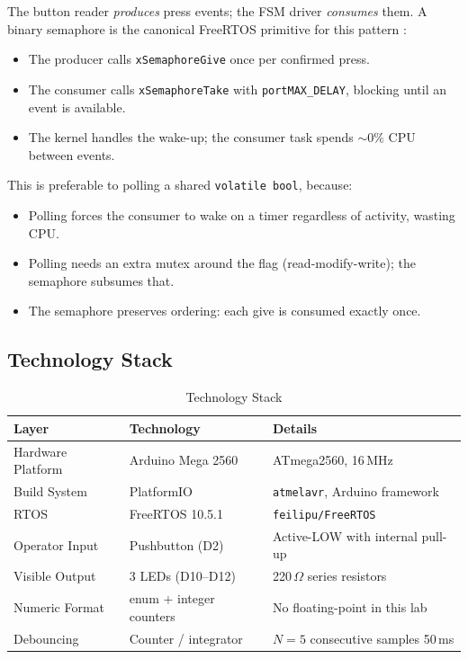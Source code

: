 \documentclass[12pt]{article}
\begin{document}
The button reader \emph{produces} press events; the FSM driver \emph{consumes} them. A binary semaphore is the canonical FreeRTOS primitive for this pattern \cite{freertos_sem}:
\begin{itemize}
  \item The producer calls \texttt{xSemaphoreGive} once per confirmed press.
  \item The consumer calls \texttt{xSemaphoreTake} with \texttt{portMAX\_DELAY}, blocking until an event is available.
  \item The kernel handles the wake-up; the consumer task spends $\sim 0\%$ CPU between events.
\end{itemize}
This is preferable to polling a shared \texttt{volatile bool}, because:
\begin{itemize}
  \item Polling forces the consumer to wake on a timer regardless of activity, wasting CPU.
  \item Polling needs an extra mutex around the flag (read-modify-write); the semaphore subsumes that.
  \item The semaphore preserves ordering: each give is consumed exactly once.
\end{itemize}

\subsection{Technology Stack}

\begin{table}[H]
\centering
\begin{tabular}{@{}lll@{}}
\toprule
\textbf{Layer} & \textbf{Technology} & \textbf{Details} \\
\midrule
Hardware Platform    & Arduino Mega 2560  & ATmega2560, 16\,MHz \\
Build System         & PlatformIO         & \texttt{atmelavr}, Arduino framework \\
RTOS                 & FreeRTOS 10.5.1    & \texttt{feilipu/FreeRTOS} \\
Operator Input       & Pushbutton (D2)    & Active-LOW with internal pull-up \\
Visible Output       & 3 LEDs (D10--D12)  & 220\,$\Omega$ series resistors \\
Numeric Format       & enum + integer counters & No floating-point in this lab \\
Debouncing           & Counter / integrator   & $N = 5$ consecutive samples \@ 50\,ms \\
\bottomrule
\end{tabular}
\caption{Technology Stack}
\label{tab:techstack}
\end{table}
\end{document}
